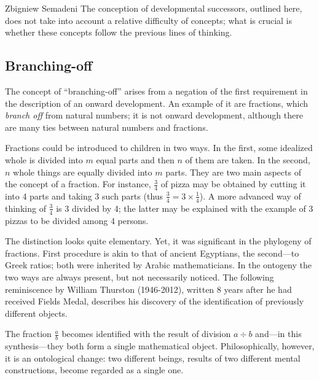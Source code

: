 \begin{artengenv}{Zbigniew Semadeni}
The conception of developmental successors, outlined here, does not take into account 
a relative difficulty of concepts; what is crucial is whether these concepts follow the previous 
lines of thinking. 

\subsection{Branching-off}
The concept of ``branching-off'' arises from a negation of the first requirement in the description 
of an onward development. An example of it are fractions, which \textit{branch off} 
from natural numbers; it is not onward development, although there are many ties 
between natural numbers and fractions. 

Fractions could be introduced to children in two ways. In the first, some 
idealized whole is divided into $m$ equal parts and then $n$ of them are taken. 
In the second, $n$ whole things are equally divided into $m$ parts. 
They are two main aspects of the concept of a fraction. For instance, $\frac{3}{4}$ 
of pizza may be obtained by cutting it into 4 parts and taking 3 such parts 
(thus $\frac{3}{4} = 3 \times \frac{1}{4}$). A more advanced way of thinking of 
$\frac{3}{4}$ is 3 divided by 4; the latter may be explained with the example 
of 3 pizzas to be divided among 4 persons. 

The distinction looks quite elementary. Yet, it was significant in the phylogeny 
of fractions. First procedure is akin to that of ancient Egyptians, the 
second---to Greek ratios; both were inherited by Arabic mathematicians. In the 
ontogeny the two ways are always present, but not necessarily noticed. The 
following reminiscence by William Thurston (1946-2012), written 8 years after 
he had received Fields Medal, describes his discovery of the identification of 
previously different objects. 


\noindent The fraction $\frac{a}{b}$ becomes identified with the result of division 
$a\div b$ and---in this synthesis---they both form a single mathematical object. 
Philosophically, however, it is an ontological change: two different beings, results 
of two different mental constructions, become regarded as a single one. 


\end{artengenv}
